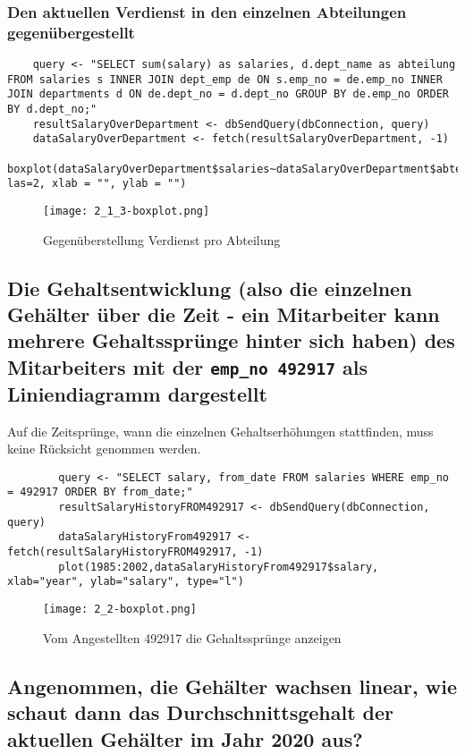 \documentclass{article}
\begin{document}
\subsubsection{Den aktuellen Verdienst in den einzelnen Abteilungen gegenübergestellt}
	\begin{lstlisting}
	query <- "SELECT sum(salary) as salaries, d.dept_name as abteilung FROM salaries s INNER JOIN dept_emp de ON s.emp_no = de.emp_no INNER JOIN departments d ON de.dept_no = d.dept_no GROUP BY de.emp_no ORDER BY d.dept_no;"
	resultSalaryOverDepartment <- dbSendQuery(dbConnection, query)
	dataSalaryOverDepartment <- fetch(resultSalaryOverDepartment, -1)
	boxplot(dataSalaryOverDepartment$salaries~dataSalaryOverDepartment$abteilung, las=2, xlab = "", ylab = "")
	\end{lstlisting}
	\begin{figure}[H]
		\begin{center}
			\texttt{[image: 2\_1\_3-boxplot.png]}
			\caption{Gegenüberstellung Verdienst pro Abteilung}
		\end{center}
	\end{figure}
\subsection{Die Gehaltsentwicklung (also die einzelnen Gehälter über die Zeit - ein Mitarbeiter kann mehrere Gehaltssprünge hinter sich haben) des Mitarbeiters mit der \texttt{emp\_no 492917} als Liniendiagramm dargestellt}

Auf die Zeitsprünge, wann die einzelnen Gehaltserhöhungen stattfinden, muss keine Rücksicht genommen werden.
\newpage
	\begin{lstlisting}
		query <- "SELECT salary, from_date FROM salaries WHERE emp_no = 492917 ORDER BY from_date;"
		resultSalaryHistoryFROM492917 <- dbSendQuery(dbConnection, query)
		dataSalaryHistoryFrom492917 <- fetch(resultSalaryHistoryFROM492917, -1)
		plot(1985:2002,dataSalaryHistoryFrom492917$salary, xlab="year", ylab="salary", type="l")
	\end{lstlisting}
	\begin{figure}[H]
		\begin{center}
			\texttt{[image: 2\_2-boxplot.png]}
			\caption{Vom Angestellten 492917 die Gehaltssprünge anzeigen}
		\end{center}
	\end{figure}
\subsection{Angenommen, die Gehälter wachsen linear, wie schaut dann das Durchschnittsgehalt der aktuellen Gehälter im Jahr 2020 aus?}
\end{document}
